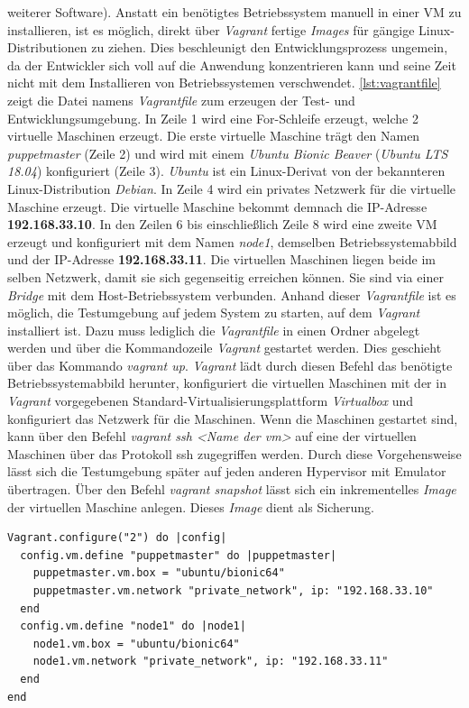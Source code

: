 \documentclass[titlepage]{report}
\begin{document}
weiterer Software). Anstatt
ein benötigtes Betriebssystem manuell in einer VM zu installieren, ist es
möglich, direkt über \emph{Vagrant} fertige \emph{Images} für gängige
Linux\hyp{}Distributionen zu ziehen. Dies beschleunigt den
Entwicklungsprozess ungemein, da der Entwickler sich voll auf die
Anwendung konzentrieren kann und seine Zeit nicht mit dem Installieren
von Betriebssystemen verschwendet. \autoref{lst:vagrantfile} zeigt
die Datei namens \emph{Vagrantfile} zum erzeugen der Test\hyp{} und
Entwicklungsumgebung. In Zeile 1 wird eine For\hyp{}Schleife erzeugt,
welche 2 virtuelle Maschinen erzeugt. Die erste virtuelle Maschine trägt
den Namen \emph{puppetmaster} (Zeile 2) und wird mit einem \emph{Ubuntu
Bionic Beaver} (\emph{Ubuntu LTS 18.04}) konfiguriert (Zeile 3). \emph{Ubuntu} ist
ein Linux\hyp{}Derivat von der bekannteren Linux\hyp{}Distribution
\emph{Debian}. In Zeile 4 wird ein privates Netzwerk für die virtuelle
Maschine erzeugt. Die virtuelle Maschine bekommt demnach die
IP\hyp{}Adresse \textbf{192.168.33.10}. In den Zeilen 6 bis
einschließlich Zeile 8 wird eine zweite VM erzeugt und konfiguriert mit
dem Namen \emph{node1}, demselben Betriebssystemabbild und der
IP\hyp{}Adresse \textbf{192.168.33.11}. Die virtuellen Maschinen liegen
beide im selben Netzwerk, damit sie sich gegenseitig erreichen können.
Sie sind via einer \emph{Bridge} mit dem Host\hyp{}Betriebssystem verbunden.
Anhand dieser \emph{Vagrantfile} ist es möglich, die Testumgebung auf jedem System zu
starten, auf dem \emph{Vagrant} installiert ist. Dazu muss lediglich die
\emph{Vagrantfile} in einen Ordner abgelegt werden und über die
Kommandozeile \emph{Vagrant} gestartet werden. Dies geschieht über das
Kommando \emph{vagrant up}. \emph{Vagrant} lädt durch diesen Befehl das
benötigte Betriebssystemabbild herunter, konfiguriert die virtuellen
Maschinen mit der in \emph{Vagrant} vorgegebenen
Standard\hyp{}Virtualisierungsplattform \emph{Virtualbox} und
konfiguriert das Netzwerk für die Maschinen. Wenn die Maschinen
gestartet sind, kann über den Befehl \emph{vagrant ssh <Name der vm>} auf
eine der virtuellen Maschinen über das Protokoll \gls{ssh} zugegriffen werden.
Durch diese Vorgehensweise lässt sich die Testumgebung später auf jeden
anderen Hypervisor mit Emulator übertragen. Über den Befehl
\emph{vagrant snapshot} lässt sich ein inkrementelles \emph{Image} der
virtuellen Maschine anlegen. Dieses \emph{Image} dient als Sicherung.
\begin{minipage}{\linewidth}
\begin{lstlisting}[caption={Vagrantfile der Test- und Entwicklungsumgebung},label={lst:vagrantfile}]
Vagrant.configure("2") do |config|
  config.vm.define "puppetmaster" do |puppetmaster|
    puppetmaster.vm.box = "ubuntu/bionic64"
    puppetmaster.vm.network "private_network", ip: "192.168.33.10"
  end
  config.vm.define "node1" do |node1|
    node1.vm.box = "ubuntu/bionic64"
    node1.vm.network "private_network", ip: "192.168.33.11"
  end
end
\end{lstlisting}
\end{minipage}
\end{document}
